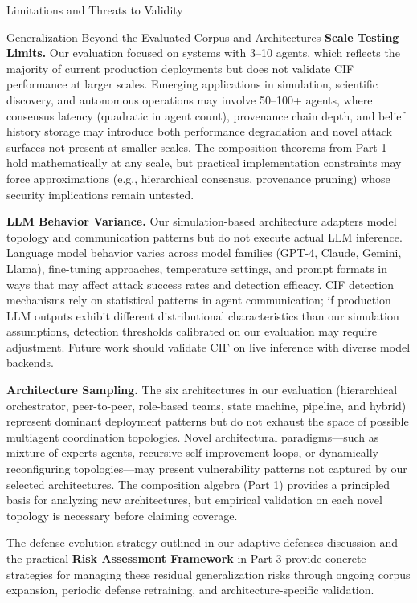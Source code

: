 \documentclass[
  ignorenonframetext,
]{beamer}
\begin{document}
\begin{frame}{Limitations and Threats to Validity}
\begin{block}{Generalization Beyond the Evaluated Corpus and
Architectures}
\textbf{Scale Testing Limits.} Our evaluation focused on systems with
3--10 agents, which reflects the majority of current production
deployments but does not validate CIF performance at larger scales.
Emerging applications in simulation, scientific discovery, and
autonomous operations may involve 50--100+ agents, where consensus
latency (quadratic in agent count), provenance chain depth, and belief
history storage may introduce both performance degradation and novel
attack surfaces not present at smaller scales. The composition theorems
from Part 1 hold mathematically at any scale, but practical
implementation constraints may force approximations (e.g., hierarchical
consensus, provenance pruning) whose security implications remain
untested.

\textbf{LLM Behavior Variance.} Our simulation-based architecture
adapters model topology and communication patterns but do not execute
actual LLM inference. Language model behavior varies across model
families (GPT-4, Claude, Gemini, Llama), fine-tuning approaches,
temperature settings, and prompt formats in ways that may affect attack
success rates and detection efficacy. CIF detection mechanisms rely on
statistical patterns in agent communication; if production LLM outputs
exhibit different distributional characteristics than our simulation
assumptions, detection thresholds calibrated on our evaluation may
require adjustment. Future work should validate CIF on live inference
with diverse model backends.

\textbf{Architecture Sampling.} The six architectures in our evaluation
(hierarchical orchestrator, peer-to-peer, role-based teams, state
machine, pipeline, and hybrid) represent dominant deployment patterns
but do not exhaust the space of possible multiagent coordination
topologies. Novel architectural paradigms---such as mixture-of-experts
agents, recursive self-improvement loops, or dynamically reconfiguring
topologies---may present vulnerability patterns not captured by our
selected architectures. The composition algebra (Part 1) provides a
principled basis for analyzing new architectures, but empirical
validation on each novel topology is necessary before claiming coverage.

The defense evolution strategy outlined in our adaptive defenses
discussion and the practical \textbf{Risk Assessment Framework} in Part
3 provide concrete strategies for managing these residual generalization
risks through ongoing corpus expansion, periodic defense retraining, and
architecture-specific validation.
\end{block}


\end{frame}
\end{document}
